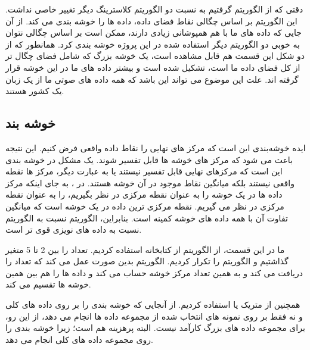 \documentclass[12pt,onecolumn,a4paper]{article}
\begin{document}
دقتی که از الگوریتم  گرفتیم به نسبت دو الگوریتم کلاسترینگ دیگر تغییر خاصی نداشت. این الگوریتم بر اساس چگالی نقاط فضای داده، داده ها را خوشه بندی می کند. از آن جایی که داده های ما با هم همپوشانی زیادی دارند، ممکن است بر اساس چگالی نتوان به خوبی دو الگوریتم دیگر استفاده شده در این پروژه خوشه بندی کرد. همانطور که از دو شکل این قسمت هم قابل مشاهده است، یک خوشه بزرگ که شامل فضای چگال تر از کل فضای داده ما است، تشکیل شده است و بیشتر داده های ما در این خوشه قرار گرفته اند. علت این موضوع می تواند این باشد که همه داده های صوتی ما از یک زبان یک کشور هستند.

\subsection{خوشه بند }

ایده خوشه‌بندی  این است که مرکز های نهایی را نقاط داده واقعی فرض کنیم. این نتیجه باعث می شود که مرکز های خوشه ها قابل تفسیر شوند. یک مشکل در خوشه بندی  این است که مرکزهای نهایی قابل تفسیر نیستند یا به عبارت دیگر، مرکز ها نقطه واقعی نیستند بلکه میانگین نقاط موجود در آن خوشه هستند. در ، به جای اینکه مرکز داده ها در یک خوشه را به عنوان نقطه مرکزی در نظر بگیریم،  را به عنوان نقطه مرکزی در نظر می گیریم. نقطه  مرکزی ترین داده در یک خوشه است که میانگین تفاوت آن با همه داده های خوشه کمینه است. بنابراین، الگوریتم  نسبت به الگوریتم  نسبت به داده های نویزی قوی تر است.

ما در این قسمت، از الگوریتم  از کتابخانه  استفاده کردیم.
تعداد  را بین 2 تا 5 متغیر گذاشتیم و الگوریتم را تکرار کردیم. الگوریتم بدین صورت عمل می کند که تعداد  را دریافت می کند و به همین تعداد مرکز خوشه حساب می کند و داده ها را هم بین همین خوشه ها تقسیم می کند.

همچنین از متریک  یا  استفاده کردیم. از آنجایی که خوشه بندی را بر روی داده های کلی و نه فقط بر روی نمونه های انتخاب شده از مجموعه داده ها انجام می دهد، از این رو، برای مجموعه داده های بزرگ کارآمد نیست. البته  پرهزینه هم است؛ زیرا خوشه بندی را روی مجموعه داده های کلی انجام می دهد.
\end{document}
